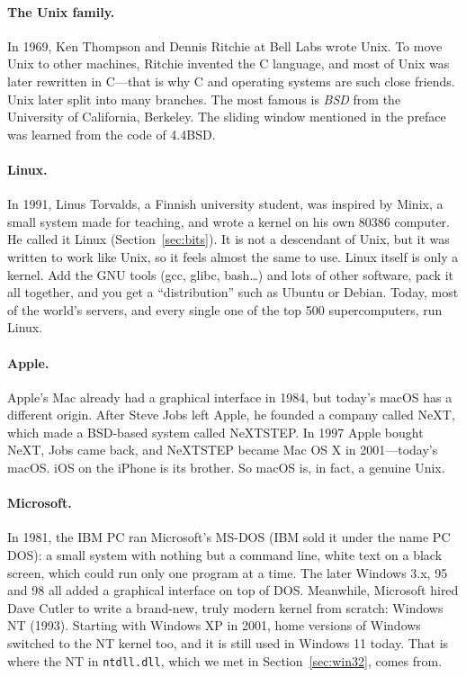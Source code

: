 \paragraph{The Unix family.}
In 1969, Ken Thompson and Dennis Ritchie at Bell Labs wrote Unix. To move Unix to other machines, Ritchie invented the C language, and most of Unix was later rewritten in C---that is why C and operating systems are such close friends. Unix later split into many branches. The most famous is \emph{BSD} from the University of California, Berkeley. The sliding window mentioned in the preface was learned from the code of 4.4BSD.

\paragraph{Linux.}
In 1991, Linus Torvalds, a Finnish university student, was inspired by Minix, a small system made for teaching, and wrote a kernel on his own 80386 computer. He called it Linux (Section~\ref{sec:bits}). It is not a descendant of Unix, but it was written to work like Unix, so it feels almost the same to use. Linux itself is only a kernel. Add the GNU tools (gcc, glibc, bash\ldots{}) and lots of other software, pack it all together, and you get a ``distribution'' such as Ubuntu or Debian. Today, most of the world's servers, and every single one of the top 500 supercomputers, run Linux.

\paragraph{Apple.}
Apple's Mac already had a graphical interface in 1984, but today's macOS has a different origin. After Steve Jobs left Apple, he founded a company called NeXT, which made a BSD-based system called NeXTSTEP. In 1997 Apple bought NeXT, Jobs came back, and NeXTSTEP became Mac OS X in 2001---today's macOS. iOS on the iPhone is its brother. So macOS is, in fact, a genuine Unix.

\paragraph{Microsoft.}
In 1981, the IBM PC ran Microsoft's MS-DOS (IBM sold it under the name PC DOS): a small system with nothing but a command line, white text on a black screen, which could run only one program at a time. The later Windows 3.x, 95 and 98 all added a graphical interface on top of DOS. Meanwhile, Microsoft hired Dave Cutler to write a brand-new, truly modern kernel from scratch: Windows NT (1993). Starting with Windows XP in 2001, home versions of Windows switched to the NT kernel too, and it is still used in Windows 11 today. That is where the NT in \texttt{ntdll.dll}, which we met in Section~\ref{sec:win32}, comes from.

